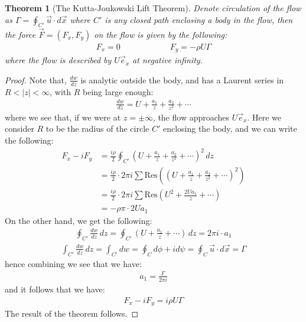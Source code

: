 \documentclass[11pt]{book}
\theoremstyle{break}
\theoremstyle{break}
\newtheorem{thm}{Theorem}[section]
\begin{document}
\begin{thm}[The Kutta-Joukowski Lift Theorem]
Denote circulation of the flow as $\Gamma = \oint_{C'} \vec{u}\cdot d\vec{x}$ where $C'$ is any closed path enclosing a body in the flow, then the force $\vec{F} =(F_x,F_y )$ on the flow is given by the following:
\begin{align*}
F_x = 0 \qquad\qquad\qquad F_y = -\rho U \Gamma
\end{align*}
where the flow is described by $U\vec{e}_x$ at negative infinity. 
\end{thm}
\begin{proof}
Note that, $\frac{dw}{dz}$ is analytic outside the body, and has a Laurent series in $R<|z|<\infty$, with $R$ being large enough:
\begin{align*}
\frac{dw}{dz} = U + \frac{a_1}{z}+\frac{a_2}{z^2} + \cdots 
\end{align*}
where we see that, if we were at $z = \pm \infty$, the flow approaches $U\vec{e}_x$. Here we consider $R$ to be the radius of the circle $C'$ enclosing the body, and we can write the following:
\begin{align*}
F_x - iF_y 
&= \frac{i\rho}{2}\oint_{C'}\left( U + \frac{a_1}{z} + \frac{a_2}{z^2}+\cdots \right)^2 \, dz \\
&= \frac{i\rho }{2}\cdot 2\pi i \sum \text{Res}\left(\left( U+ \frac{a_1}{z}+ \frac{a_2}{z^2}+\cdots \right)^2\right)\\
&= \frac{i\rho }{2}\cdot 2\pi i \sum \text{Res}\left(U^2 + \frac{2Ua_1}{z}+ \cdots \right)\\
&= -\rho \pi \cdot 2U a_1
\end{align*} 
On the other hand, we get the following:
\begin{align*}
\oint_{C'} \frac{dw}{dz}\, dz = \oint_{C'} \left( U + \frac{a_1}{z}+ \cdots\right) \, dz = 2\pi i \cdot a_1
\end{align*}
\begin{align*}
\int_{C'}\frac{dw}{dz}\, dz = \int_{C'}dw = \oint_{C} d\phi + id\psi = \oint_C \vec{u}\cdot d\vec{x} = \Gamma
\end{align*}
hence combining we see that we have:
\begin{align*}
a_1 = \frac{\Gamma}{2\pi i}
\end{align*}
and it follows that we have:
\begin{align*}
F_x - iF_y = i \rho U \Gamma
\end{align*}
The result of the theorem follows. 
\end{proof}
\newpage
\end{document}
